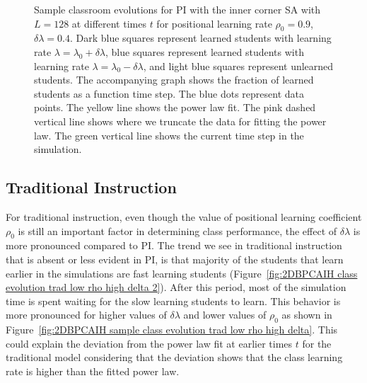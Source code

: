 \begin{figure}[htbp!]
   \caption[Example classroom evolution for heterogeneous PI set up with high positional learning factor $\rho_0$ and high heterogeneity $\delta\lambda$]{Sample classroom evolutions for PI with the inner corner SA with $L=128$ at different times $t$ for positional learning rate $\rho_0=0.9$, $\delta\lambda = 0.4$.
   Dark blue squares represent learned students with learning rate $\lambda = \lambda_0 + \delta\lambda$, blue squares represent learned students with learning rate $\lambda = \lambda_0 - \delta\lambda$, and light blue squares represent unlearned students.
   The accompanying graph shows the fraction of learned students as a function time step.
   The blue dots represent data points. 
   The yellow line shows the power law fit.
   The pink dashed vertical line shows where we truncate the data for fitting the power law.
   The green vertical line shows the current time step in the simulation.
   }
   \label{fig:2DBPCAIH sample class evolution high rho high delta}
\end{figure}

\subsection{Traditional Instruction}
For traditional instruction, even though the value of positional learning coefficient $\rho_0$ is still an important factor in determining class performance, the effect of $\delta\lambda$ is more pronounced compared to PI.
The trend we see in traditional instruction that is absent or less evident in PI, is that majority of the students that learn earlier in the simulations are fast learning students (Figure~\ref{fig:2DBPCAIH class evolution trad low rho high delta 2}). 
After this period, most of the simulation time is spent waiting for the slow learning students to learn.
This behavior is more pronounced for higher values of $\delta\lambda$ and lower values of $\rho_0$ as shown in Figure~\ref{fig:2DBPCAIH sample class evolution trad low rho high delta}.
This could explain the deviation from the power law fit at earlier times $t$ for the traditional model considering that the deviation shows that the class learning rate is higher than the fitted power law.

